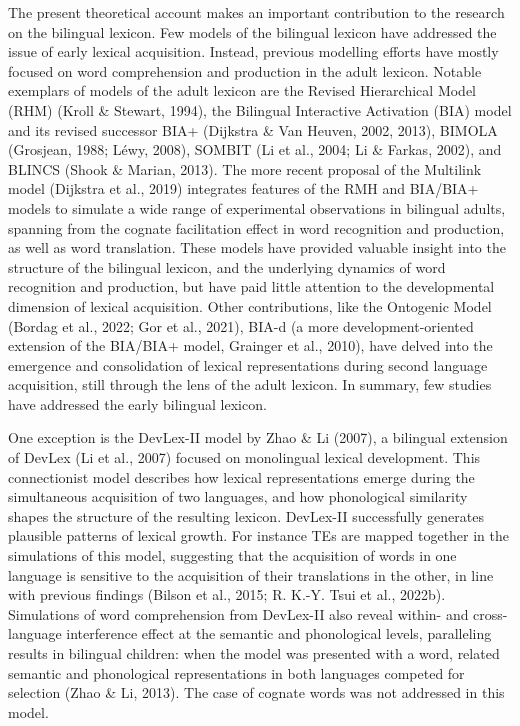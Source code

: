 \documentclass[
  12pt,
  b5paperpaper,
  twoside]{scrreprt}
\begin{document}
The present theoretical account makes an important contribution to the
research on the bilingual lexicon. Few models of the bilingual lexicon
have addressed the issue of early lexical acquisition. Instead, previous
modelling efforts have mostly focused on word comprehension and
production in the adult lexicon. Notable exemplars of models of the
adult lexicon are the Revised Hierarchical Model (RHM) (Kroll \&
Stewart, 1994), the Bilingual Interactive Activation (BIA) model and its
revised successor BIA+ (Dijkstra \& Van Heuven, 2002, 2013), BIMOLA
(Grosjean, 1988; Léwy, 2008), SOMBIT (Li et al., 2004; Li \& Farkas,
2002), and BLINCS (Shook \& Marian, 2013). The more recent proposal of
the Multilink model (Dijkstra et al., 2019) integrates features of the
RMH and BIA/BIA+ models to simulate a wide range of experimental
observations in bilingual adults, spanning from the cognate facilitation
effect in word recognition and production, as well as word translation.
These models have provided valuable insight into the structure of the
bilingual lexicon, and the underlying dynamics of word recognition and
production, but have paid little attention to the developmental
dimension of lexical acquisition. Other contributions, like the
Ontogenic Model (Bordag et al., 2022; Gor et al., 2021), BIA-d (a more
development-oriented extension of the BIA/BIA+ model, Grainger et al.,
2010), have delved into the emergence and consolidation of lexical
representations during second language acquisition, still through the
lens of the adult lexicon. In summary, few studies have addressed the
early bilingual lexicon.

One exception is the DevLex-II model by Zhao \& Li (2007), a bilingual
extension of DevLex (Li et al., 2007) focused on monolingual lexical
development. This connectionist model describes how lexical
representations emerge during the simultaneous acquisition of two
languages, and how phonological similarity shapes the structure of the
resulting lexicon. DevLex-II successfully generates plausible patterns
of lexical growth. For instance TEs are mapped together in the
simulations of this model, suggesting that the acquisition of words in
one language is sensitive to the acquisition of their translations in
the other, in line with previous findings (Bilson et al., 2015; R. K.-Y.
Tsui et al., 2022b). Simulations of word comprehension from DevLex-II
also reveal within- and cross-language interference effect at the
semantic and phonological levels, paralleling results in bilingual
children: when the model was presented with a word, related semantic and
phonological representations in both languages competed for selection
(Zhao \& Li, 2013). The case of cognate words was not addressed in this
model.
\end{document}
